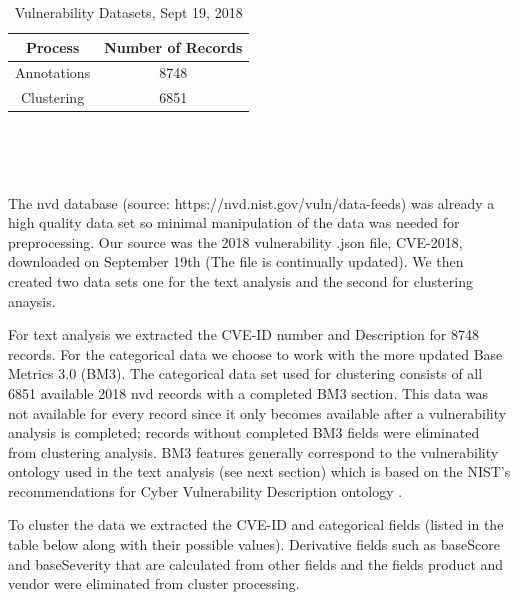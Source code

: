 \documentclass{article} %
\begin{document}
\begin{table}[h!]
\begin{center} 
\begin{tabular}{ |c|c|  } \hline
 Process & Number of Records \\ \hline
 Annotations & 8748  \\  \hline
 Clustering & 6851  \\   \hline
\end{tabular} \\
\label{table:1}
\end{center}
\label{table:1}
\caption{Vulnerability Datasets, Sept 19, 2018} \\
\end{table}

The nvd database (source:  https://nvd.nist.gov/vuln/data-feeds) was already a high quality data set so minimal manipulation of the data was needed for preprocessing. Our source was the 2018 vulnerability .json file, CVE-2018, downloaded on September 19th (The file is continually updated). We then created two data sets one for the text analysis and the second for clustering anaysis.  

For text analysis we extracted the CVE-ID number and Description for 8748 records.  For the categorical data we choose to work with the more updated Base Metrics 3.0 (BM3). The categorical data set used for clustering consists of all 6851 available 2018 nvd records with a completed BM3 section.  This data was not available for every record since it only becomes available after a vulnerability analysis is completed; records without completed BM3 fields were eliminated from clustering analysis.  BM3 features generally correspond to the vulnerability ontology used in the text analysis (see next section) which is based on the NIST's recommendations for Cyber Vulnerability Description ontology \cite{Booth2016DraftOntology}.

To cluster the data we extracted the CVE-ID and categorical fields (listed in the table below along with their possible values).  Derivative fields such as baseScore and baseSeverity that are calculated from other fields and the fields product and vendor were eliminated from cluster processing.    
\end{document}
